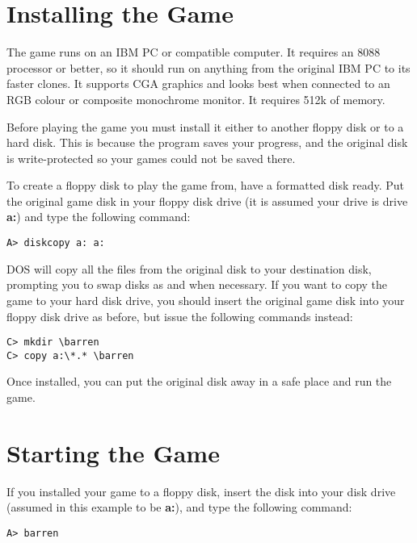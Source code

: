 \section{Installing the Game}

\noindent
The game runs on an IBM PC or compatible computer. It requires an 8088 processor or better, so it should run on anything from the original IBM PC to its faster clones. It supports CGA graphics and looks best when connected to an RGB colour or composite monochrome monitor. It requires 512k of memory.

Before playing the game you must install it either to another floppy disk or to a hard disk. This is because the program saves your progress, and the original disk is write-protected so your games could not be saved there. 

To create a floppy disk to play the game from, have a formatted disk ready. Put the original game disk in your floppy disk drive (it is assumed your drive is drive {\bf a:}) and type the following command:

\begin{verbatim}
A> diskcopy a: a:
\end{verbatim}

\noindent
DOS will copy all the files from the original disk to your destination disk, prompting you to swap disks as and when necessary. If you want to copy the game to your hard disk drive, you should insert the original game disk into your floppy disk drive as before, but issue the following commands instead:

\begin{verbatim}
C> mkdir \barren
C> copy a:\*.* \barren
\end{verbatim}

\noindent
Once installed, you can put the original disk away in a safe place and run the game.


\section{Starting the Game}

\noindent
If you installed your game to a floppy disk, insert the disk into your disk drive (assumed in this example to be {\bf a:}), and type the following command:

\begin{verbatim}
A> barren
\end{verbatim}

